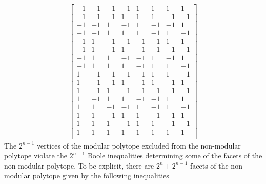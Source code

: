 \documentclass[10pt]{article}
\begin{document}
\begin{equation}
\begin{aligned}\label{eq:nonmodvertexp}
\begin{bmatrix}
  -1 & -1 & -1 & -1 & 1 & 1 & 1 & 1\\
  -1 & -1 & -1 & 1 & 1 & 1 & -1 & -1\\
  -1 & -1 & 1 & -1 & 1 & -1 & -1 & 1\\
  -1 & -1 & 1 & 1 & 1 & -1 & 1 & -1\\
  -1 & 1 & -1 & -1 & -1 & -1 & 1 & 1\\
  -1 & 1 & -1 & 1 & -1 & -1 & -1 & -1\\
  -1 & 1 & 1 & -1 & -1 & 1 & -1 & 1\\
  -1 & 1 & 1 & 1 & -1 & 1 & 1 & -1\\
  1 & -1 & -1 & -1 & -1 & 1 & 1 & -1\\
  1 & -1 & -1 & 1 & -1 & 1 & -1 & 1\\
  1 & -1 & 1 & -1 & -1 & -1 & -1 & -1\\
  1 & -1 & 1 & 1 & -1 & -1 & 1 & 1\\
  1 & 1 & -1 & -1 & 1 & -1 & 1 & -1\\
  1 & 1 & -1 & 1 & 1 & -1 & -1 & 1\\
  1 & 1 & 1 & -1 & 1 & 1 & -1 & -1\\
  1 & 1 & 1 & 1 & 1 & 1 & 1 & 1\\
\end{bmatrix}
\end{aligned}
\end{equation}
The $2^{n-1}$ vertices of the modular polytope excluded from the non-modular polytope violate the $2^{n-1}$ Boole inequalities determining some of the facets of the non-modular polytope. To be explicit, there are $2^n + 2^{n-1}$ facets of the non-modular polytope given by the following inequalities
\end{document}
